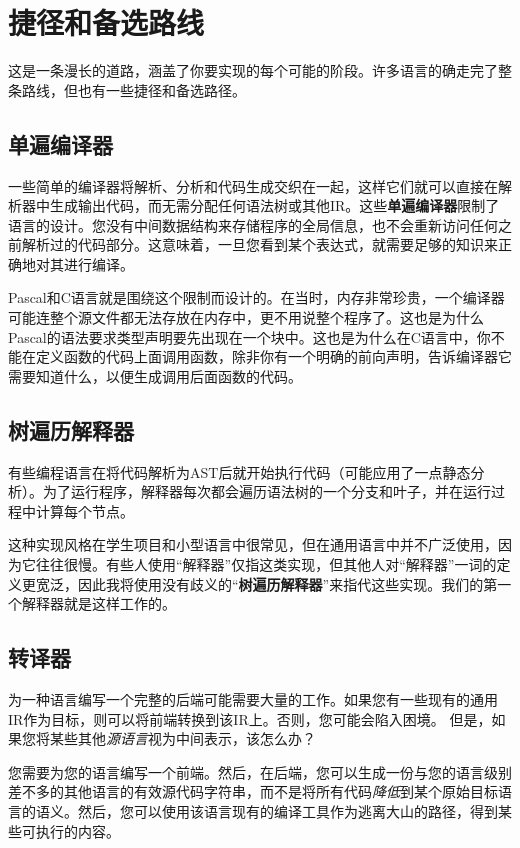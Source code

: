 \documentclass[cn,11pt,chinese]{elegantbook}
\begin{document}
\section{捷径和备选路线}

这是一条漫长的道路，涵盖了你要实现的每个可能的阶段。许多语言的确走完了整条路线，但也有一些捷径和备选路径。

\subsection{单遍编译器}

一些简单的编译器将解析、分析和代码生成交织在一起，这样它们就可以直接在解析器中生成输出代码，而无需分配任何语法树或其他IR。这些\textbf{单遍编译器}限制了语言的设计。您没有中间数据结构来存储程序的全局信息，也不会重新访问任何之前解析过的代码部分。这意味着，一旦您看到某个表达式，就需要足够的知识来正确地对其进行编译。

Pascal和C语言就是围绕这个限制而设计的。在当时，内存非常珍贵，一个编译器可能连整个源文件都无法存放在内存中，更不用说整个程序了。这也是为什么Pascal的语法要求类型声明要先出现在一个块中。这也是为什么在C语言中，你不能在定义函数的代码上面调用函数，除非你有一个明确的前向声明，告诉编译器它需要知道什么，以便生成调用后面函数的代码。

\subsection{树遍历解释器}

有些编程语言在将代码解析为AST后就开始执行代码（可能应用了一点静态分析）。为了运行程序，解释器每次都会遍历语法树的一个分支和叶子，并在运行过程中计算每个节点。

这种实现风格在学生项目和小型语言中很常见，但在通用语言中并不广泛使用，因为它往往很慢。有些人使用“解释器”仅指这类实现，但其他人对“解释器”一词的定义更宽泛，因此我将使用没有歧义的“\textbf{树遍历解释器}”来指代这些实现。我们的第一个解释器就是这样工作的。

\subsection{转译器}

为一种语言编写一个完整的后端可能需要大量的工作。如果您有一些现有的通用IR作为目标，则可以将前端转换到该IR上。否则，您可能会陷入困境。 但是，如果您将某些其他\textit{源语言}视为中间表示，该怎么办？

您需要为您的语言编写一个前端。然后，在后端，您可以生成一份与您的语言级别差不多的其他语言的有效源代码字符串，而不是将所有代码\textit{降低}到某个原始目标语言的语义。然后，您可以使用该语言现有的编译工具作为逃离大山的路径，得到某些可执行的内容。
\end{document}
